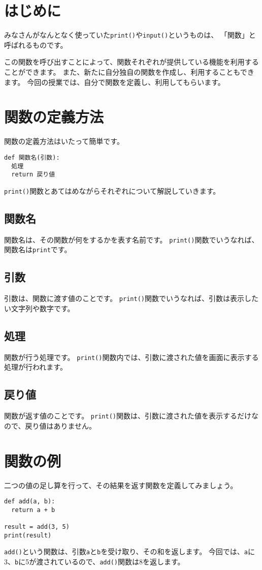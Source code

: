 \documentclass[a4paper,titlepage,dvipdfmx]{jarticle}
\begin{document}
\section{はじめに}
みなさんがなんとなく使っていた\texttt{print()}や\texttt{input()}というものは、
「関数」と呼ばれるものです。

この関数を呼び出すことによって、関数それぞれが提供している機能を利用することができます。
また、新たに自分独自の関数を作成し、利用することもできます。
今回の授業では、自分で関数を定義し、利用してもらいます。
\section{関数の定義方法}
関数の定義方法はいたって簡単です。
\begin{lstlisting}[caption=関数の定義,label=関数の定義]
def 関数名(引数):
  処理
  return 戻り値
\end{lstlisting}
\texttt{print()}関数とあてはめながらそれぞれについて解説していきます。

\subsection*{関数名}
関数名は、その関数が何をするかを表す名前です。
\texttt{print()}関数でいうなれば、関数名は\texttt{print}です。
\subsection*{引数}
引数は、関数に渡す値のことです。
\texttt{print()}関数でいうなれば、引数は表示したい文字列や数字です。
\subsection*{処理}
関数が行う処理です。
\texttt{print()}関数内では、引数に渡された値を画面に表示する処理が行われます。
\subsection*{戻り値}
関数が返す値のことです。
\texttt{print()}関数は、引数に渡された値を表示するだけなので、戻り値はありません。

\section{関数の例}
二つの値の足し算を行って、その結果を返す関数を定義してみましょう。
\begin{lstlisting}[caption=関数の例,label=関数の例]
def add(a, b):
  return a + b

result = add(3, 5)
print(result)
\end{lstlisting}
\texttt{add()}という関数は、引数\texttt{a}と\texttt{b}を受け取り、その和を返します。
今回では、\texttt{a}に3、\texttt{b}に5が渡されているので、\texttt{add()}関数は8を返します。
\end{document}

